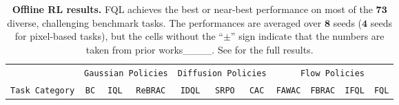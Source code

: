 \begin{table*}[t!]
\vspace{-10pt}
\caption{
\footnotesize
\textbf{Offline RL results.}
FQL achieves the best or near-best performance on most of the $\mathbf{73}$ diverse, challenging benchmark tasks.
%
%
The performances are averaged over $\mathbf{8}$ seeds ($\mathbf{4}$ seeds for pixel-based tasks),
but the cells without the ``$\pm$'' sign indicate that the numbers are taken
from prior works____.
See  for the full results.
}
\label{table:offline}
\centering
\vspace{5pt}
\scalebox{0.76}
{
%
\begin{threeparttable}
\begin{tabular}{lcccccccccc}
\toprule
%
%
%
\multicolumn{1}{c}{} & \multicolumn{3}{c}{\texttt{Gaussian Policies}} & \multicolumn{3}{c}{\texttt{Diffusion Policies}} & \multicolumn{4}{c}{\texttt{Flow Policies}} \\
\cmidrule(lr){2-4} \cmidrule(lr){5-7} \cmidrule(lr){8-11}
\texttt{Task Category} & \texttt{BC} & \texttt{IQL} & \texttt{ReBRAC} & \texttt{IDQL} & \texttt{SRPO} & \texttt{CAC} & \texttt{FAWAC} & \texttt{FBRAC} & \texttt{IFQL} & \texttt{\color{myblue}FQL} \\
\midrule




\end{tabular}
\end{threeparttable}}
\end{table*}
